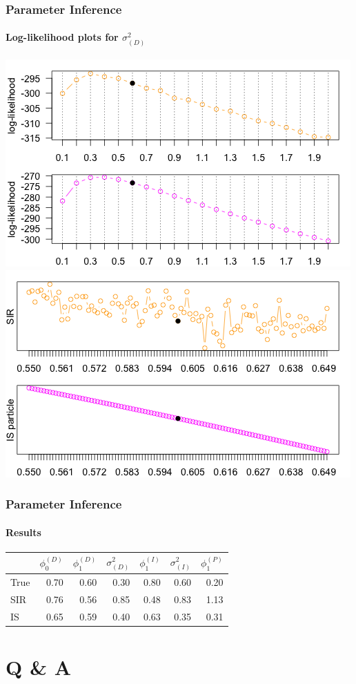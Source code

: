 \documentclass[11pt]{beamer}
\begin{document}
\begin{frame}
\frametitle{Parameter Inference}
\framesubtitle{Log-likelihood plots for $\sigma_{(D)}^2$}
\centering
\includegraphics[scale=0.30]{hdpm-loglik-Dvar}
\includegraphics[scale=0.30]{hdpm-loglik-Dvar-zoom}
\end{frame}

\begin{frame}
\frametitle{Parameter Inference}
\framesubtitle{Results}
\begin{table}
\centering
\begin{tabular}{l r r r r r r}
\hline
& $\phi_0^{(D)}$ &  $\phi_1^{(D)}$ & $\sigma^2_{(D)}$ & $\phi_1^{(I)}$ & $\sigma^2_{(I)}$ & $\phi_1^{(P)}$\\
\hline
True        & 0.70  & 0.60 &  0.30 & 0.80 & 0.60 & 0.20\\
SIR         & 0.76  & 0.56  & 0.85 & 0.48 & 0.83 & 1.13\\
IS            & 0.65  & 0.59  & 0.40 & 0.63 & 0.35 & 0.31\\
\hline
\end{tabular}
\end{table}
\end{frame}

\section{Q \& A}
\end{document}
